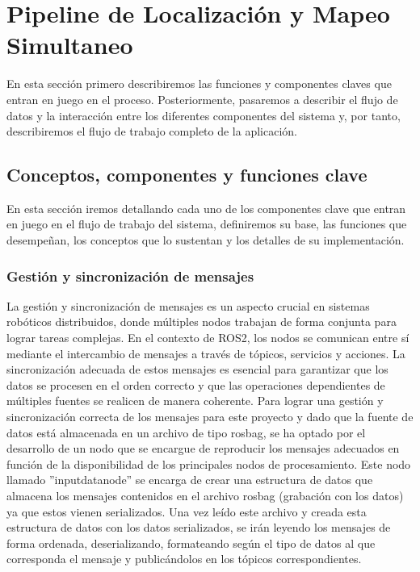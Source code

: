 \documentclass[12pt, a4paper, twoside]{article}
\begin{document}
\section{Pipeline de Localización y Mapeo Simultaneo}

En esta sección primero describiremos las funciones y componentes claves que entran en juego en el proceso. Posteriormente, pasaremos a 
describir el flujo de datos y la interacción entre los diferentes componentes del sistema y, por tanto, describiremos el flujo de trabajo 
completo de la aplicación.

\subsection{Conceptos, componentes y funciones clave}
En esta sección iremos detallando cada uno de los componentes clave que entran en juego en el flujo de trabajo del sistema, definiremos su base,
las funciones que desempeñan, los conceptos que lo sustentan y los detalles de su implementación.

\subsubsection{Gestión y sincronización de mensajes}
La gestión y sincronización de mensajes es un aspecto crucial en sistemas robóticos distribuidos, donde múltiples nodos trabajan de forma 
conjunta para lograr tareas complejas. En el contexto de ROS2, los nodos se comunican entre sí mediante el intercambio de mensajes a
través de tópicos, servicios y acciones. La sincronización adecuada de estos mensajes es esencial para garantizar que los datos se procesen 
en el orden correcto y que las operaciones dependientes de múltiples fuentes se realicen de manera coherente. \newline
Para lograr una gestión y sincronización correcta de los mensajes para este proyecto y dado que la fuente de datos está almacenada en un 
archivo de tipo rosbag, se ha optado por el desarrollo de un nodo que se encargue de reproducir los mensajes adecuados en función de la disponibilidad 
de los principales nodos de procesamiento.\newline
Este nodo llamado ''input\textunderscore data\textunderscore node'' se encarga de crear una estructura de datos que almacena los mensajes contenidos 
en el archivo rosbag (grabación con los datos) ya que estos vienen serializados. Una vez leído este archivo y creada esta estructura de datos con los 
datos serializados, se irán leyendo los mensajes de forma ordenada, deserializando, formateando según el tipo de datos al que corresponda el mensaje 
y publicándolos en los tópicos correspondientes.
\end{document}
